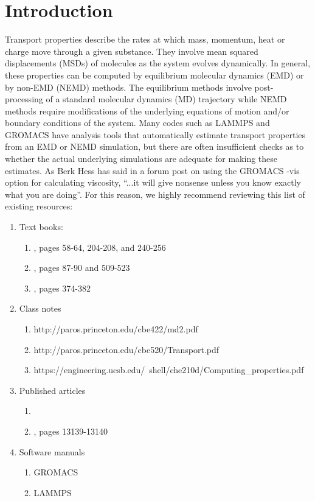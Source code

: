\documentclass[9pt]{livecoms}
\begin{document}
\section{Introduction}

Transport properties describe the rates at which mass, momentum, heat or charge move through a given substance. They involve mean squared displacements (MSDs) of molecules as the system evolves dynamically. In general, these properties can be computed by equilibrium molecular dynamics (EMD) or by non-EMD (NEMD) methods. The equilibrium methods involve post-processing of a standard molecular dynamics (MD) trajectory while NEMD methods require modifications of the underlying equations of motion and/or boundary conditions of the system. Many codes such as LAMMPS and GROMACS have analysis tools that automatically estimate transport properties from an EMD or NEMD simulation, but there are often insufficient checks as to whether the actual underlying simulations are adequate for making these estimates. As Berk Hess has said in a forum post on using the GROMACS -vis option for calculating viscosity, ``...it will give nonsense unless you know exactly what you are doing''. For this reason, we highly recommend reviewing this list of existing resources:
\begin{enumerate}
	\item Text books:
	\begin{enumerate}
		\item \cite{Allen1987}, pages 58-64, 204-208, and 240-256
		\item \cite{Frenkel2002}, pages 87-90 and 509-523
		\item \cite{Leach2001}, pages 374-382
	\end{enumerate}
	\item Class notes
	\begin{enumerate}
		\item http://paros.princeton.edu/cbe422/md2.pdf
		\item http://paros.princeton.edu/cbe520/Transport.pdf
		\item https://engineering.ucsb.edu/~shell/che210d/Computing\_properties.pdf
	\end{enumerate}
	\item Published articles
	\begin{enumerate}
		\item \cite{Hess2002}
		\item \cite{Nieto2015}, pages 13139-13140
	\end{enumerate}
	\item Software manuals
	\begin{enumerate}
		\item GROMACS
		\item LAMMPS
	\end{enumerate}
\end{enumerate}
\end{document}
